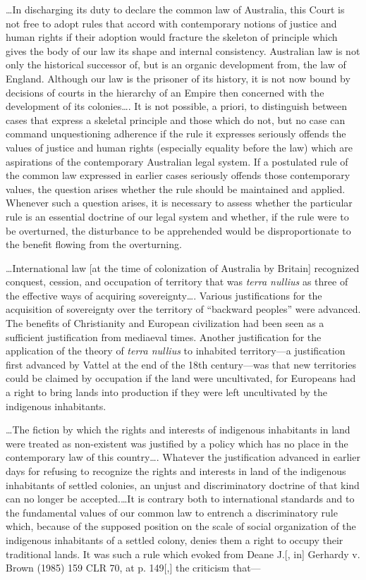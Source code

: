 \ldots In discharging its duty to declare the common law of Australia, this
Court is not free to adopt rules that accord with contemporary notions of
justice and human rights if their adoption would fracture the skeleton of
principle which gives the body of our law its shape and internal consistency.
Australian law is not only the historical successor of, but is an organic
development from, the law of England. Although our law is the prisoner of its
history, it is not now bound by decisions of courts in the hierarchy of an
Empire then concerned with the development of its colonies\ldots . It is not
possible, a priori, to distinguish between cases that express a skeletal
principle and those which do not, but no case can command unquestioning
adherence if the rule it expresses seriously offends the values of justice and
human rights (especially equality before the law) which are aspirations of the
contemporary Australian legal system. If a postulated rule of the common law
expressed in earlier cases seriously offends those contemporary values, the
question arises whether the rule should be maintained and applied. Whenever such
a question arises, it is necessary to assess whether the particular rule is an
essential doctrine of our legal system and whether, if the rule were to be
overturned, the disturbance to be apprehended would be disproportionate to the
benefit flowing from the overturning.

\ldots International law [at the time of colonization of Australia by Britain]
recognized conquest, cession, and occupation of territory that was \textit{terra
nullius} as three of the effective ways of acquiring sovereignty\ldots . Various
justifications for the acquisition of sovereignty over the territory of
``backward peoples'' were advanced. The benefits of Christianity and European
civilization had been seen as a sufficient justification from mediaeval times.
Another justification for the application of the theory of \textit{terra
nullius} to inhabited territory---a justification first advanced by Vattel at
the end of the 18th century---was that new territories could be claimed by
occupation if the land were uncultivated, for Europeans had a right to bring
lands into production if they were left uncultivated by the indigenous
inhabitants.

\ldots The fiction by which the rights and interests of indigenous inhabitants
in land were treated as non-existent was justified by a policy which has no
place in the contemporary law of this country\ldots . Whatever the justification
advanced in earlier days for refusing to recognize the rights and interests in
land of the indigenous inhabitants of settled colonies, an unjust and
discriminatory doctrine of that kind can no longer be accepted.\ldots It is
contrary both to international standards and to the fundamental values of our
common law to entrench a discriminatory rule which, because of the supposed
position on the scale of social organization of the indigenous inhabitants of a
settled colony, denies them a right to occupy their traditional lands. It was
such a rule which evoked from Deane J.[, in] Gerhardy v. Brown (1985) 159 CLR
70, at p. 149[,] the criticism that---

